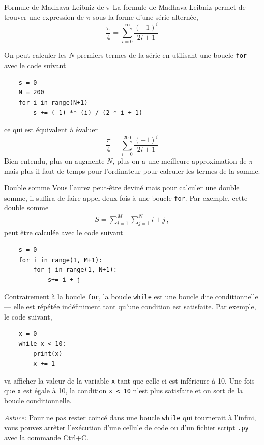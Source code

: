 \documentclass[titlepage]{article}
\theoremstyle{cleanremark}
\begin{document}
\begin{example}{Formule de Madhava-Leibniz de $\pi$}{}
   La formule de Madhava-Leibniz permet de trouver une expression de $\pi$ sous la forme 
   d'une série alternée,
   \begin{equation*}
   \frac{\pi}{4} = \sum_{i=0}^{\infty}\frac{(-1)^{i}}{2i + 1}
   \end{equation*}

   On peut calculer les $N$ premiers termes de la série en utilisant une boucle \texttt{for} avec le code suivant
   \begin{verbatim}
    s = 0
    N = 200
    for i in range(N+1)
        s += (-1) ** (i) / (2 * i + 1)
   \end{verbatim}
   ce qui est équivalent à évaluer 
   \begin{equation*}
   \frac{\pi}{4} = \sum_{i=0}^{200}\frac{(-1)^{i}}{2i + 1}
   \end{equation*}
   Bien entendu, plus on augmente $N$, plus on a une meilleure approximation de $\pi$ mais plus il faut de temps pour l'ordinateur pour calculer les termes de la somme.
\end{example}

\begin{example}{Double somme}{}
    Vous l'aurez peut-être deviné mais pour calculer une double somme, il suffira de faire appel deux fois à une boucle \texttt{for}.
    Par exemple, cette double somme
    \begin{align}
        S = \sum_{i=1}^{M} \sum_{j=1}^{N} i+j \, ,
    \end{align}
    peut être calculée avec le code suivant
    \begin{verbatim}
    s = 0
    for i in range(1, M+1):
        for j in range(1, N+1):
            s+= i + j
    \end{verbatim}
\end{example}

\noindent Contrairement à la boucle \texttt{for}, la boucle \texttt{while} est une boucle
dite conditionnelle --- elle est répétée indéfiniment tant qu'une condition est satisfaite.
Par exemple, le code suivant,
\begin{verbatim}
    x = 0
    while x < 10:
        print(x)
        x += 1 
\end{verbatim}
va afficher la valeur de la variable \texttt{x} tant que celle-ci est inférieure à 10. Une fois que \texttt{x} est égale à 10, la condition
\texttt{x < 10} n'est plus satisfaite et on sort de la boucle conditionnelle.
\begin{center}
    \textit{Astuce:} Pour ne pas rester coincé dans une boucle \texttt{while} qui tournerait à l'infini, vous pouvez arrêter l'exécution d'une cellule de code ou d'un fichier script \texttt{.py} avec la commande Ctrl+C.
\end{center}
\end{document}
